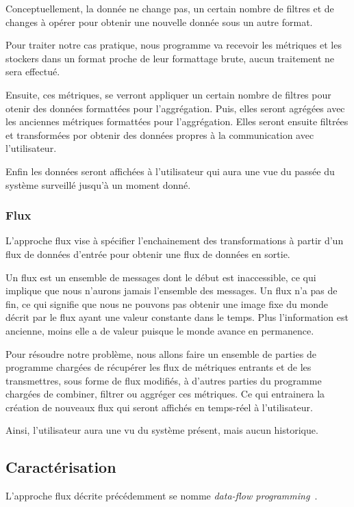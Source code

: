 \documentclass{article}
\begin{document}
Conceptuellement, la donnée ne change pas, un certain nombre de filtres et de
changes à opérer pour obtenir une nouvelle donnée sous un autre format.

Pour traiter notre cas pratique, nous programme va recevoir les métriques et
les stockers dans un format proche de leur formattage brute, aucun traitement
ne sera effectué.

Ensuite, ces métriques, se verront appliquer un certain nombre de filtres pour
otenir des données formattées pour l'aggrégation.
Puis, elles seront agrégées avec les anciennes métriques formattées pour l'aggrégation.
Elles seront ensuite filtrées et transformées por obtenir des données propres à
la communication avec l'utilisateur.

Enfin les données seront affichées à l'utilisateur qui aura une vue du passée du
système surveillé jusqu'à un moment donné.

\subsubsection{Flux}
L'approche flux vise à spécifier l'enchainement des transformations à partir
d'un flux de données d'entrée pour obtenir une flux de données en sortie.

Un flux est un ensemble de messages dont le début est inaccessible, ce qui
implique que nous n'aurons jamais l'ensemble des messages.
Un flux n'a pas de fin, ce qui signifie que nous ne pouvons pas obtenir une
image fixe du monde décrit par le flux ayant une valeur constante dans le temps.
Plus l'information est ancienne, moins elle a de valeur puisque le monde avance
en permanence.

Pour résoudre notre problème, nous allons faire un ensemble de parties de programme
chargées de récupérer les flux de métriques entrants et de les transmettres,
sous forme de flux modifiés, à d'autres parties du programme chargées de combiner,
filtrer ou aggréger ces métriques.
Ce qui entrainera la création de nouveaux flux qui seront affichés en temps-réel
à l'utilisateur.

Ainsi, l'utilisateur aura une vu du système présent, mais aucun historique.

\subsection{Caractérisation}
L'approche flux décrite précédemment se nomme \emph{data-flow programming}~\cite{dataflow}.
\end{document}
